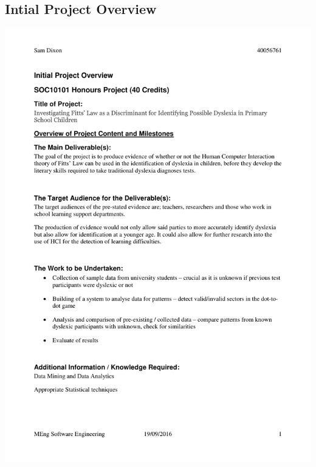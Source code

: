 \newpage
\begin{appendices}
	\section{Intial Project Overview}
		\includegraphics[page=1, width={\textwidth}]{../images/ipo}		

\end{appendices}
